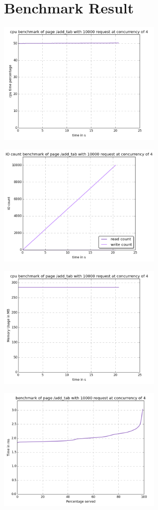 
\section{Benchmark Result}
\begin{center}
\includegraphics[width=0.6\textwidth]{img/add_tab.cpu.png}



\includegraphics[width=0.6\textwidth]{img/add_tab.io-count.png}



\includegraphics[width=0.6\textwidth]{img/add_tab.mem.png}



\includegraphics[width=0.6\textwidth]{img/add_tab.serv-time.png}




\end{center}
